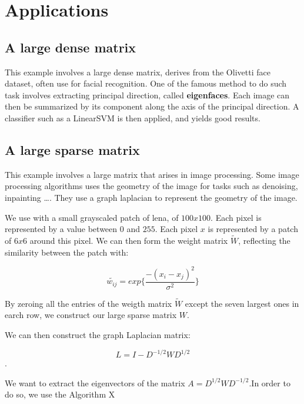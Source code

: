 \documentclass[onecolumn,12pt]{article}
\begin{document}
\section{Applications}
\subsection{A large dense matrix}
This example involves a large dense matrix, derives from the Olivetti face
dataset, often use for facial recognition. One of the famous method to do such
task involves extracting principal direction, called \textbf{eigenfaces}. Each
image can then be summarized by its component along the axis of the principal
direction. A classifier such as a LinearSVM is then applied, and yields good
results.




\subsection{A large sparse matrix}

This example involves a large matrix that arises in image processing. Some
image processing algorithms uses the geometry of the image for tasks such as
denoising, inpainting \dots. They use a graph laplacian to represent the
geometry of the image.

We use with a small grayscaled patch of lena, of $100 x 100$. Each pixel is
represented by a value between $0$ and $255$. Each pixel $x$ is represented by
a patch of $6x6$ around this pixel. We can then form the weight matrix
$\tilde{W}$, reflecting the similarity between the patch with:

$$\tilde{w_{ij}} = exp \{ \frac{- (x_i - x_j)^2}{\sigma^2}\}$$

By zeroing all the entries of the weigth matrix $\tilde{W}$ except the seven
largest ones in earch row, we construct our large sparse matrix $W$.

We can then construct the graph Laplacian matrix:

$$L = I - D^{-1/2} W D^{1/2}$$.

We want to extract the eigenvectors of the matrix $A= D^{1/2} W D^{-1/2}$.In
order to do so, we use the Algorithm X


\end{document}
